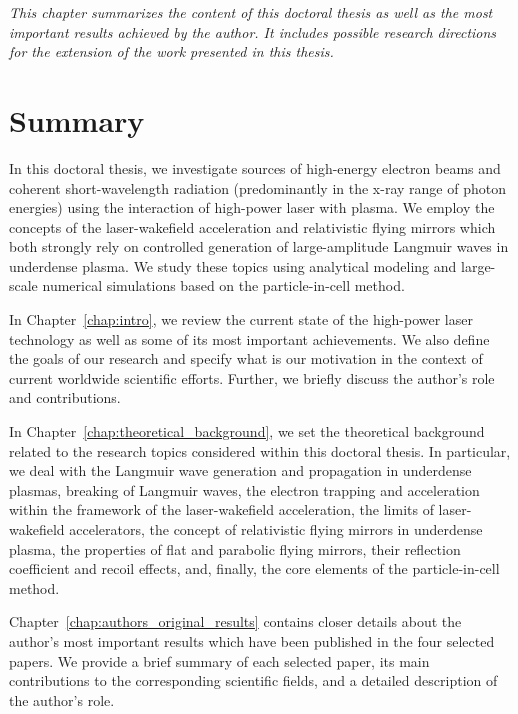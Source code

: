 \documentclass[10pt, a4paper, twoside, openright]{report}
\begin{document}
\noindent \textsl{This chapter summarizes the content of this doctoral thesis as well as the most important results achieved by the author. It includes possible research directions for the extension of the work presented in this thesis.}

\section{Summary}

In this doctoral thesis, we investigate sources of high-energy electron beams and coherent short-wavelength radiation (predominantly in the x-ray range of photon energies) using the interaction of high-power laser with plasma. We employ the concepts of the laser-wakefield acceleration and relativistic flying mirrors which both strongly rely on controlled generation of large-amplitude Langmuir waves in underdense plasma. We study these topics using analytical modeling and large-scale numerical simulations based on the particle-in-cell method.

In Chapter~\ref{chap:intro}, we review the current state of the high-power laser technology as well as some of its most important achievements. We also define the goals of our research and specify what is our motivation in the context of current worldwide scientific efforts. Further, we briefly discuss the author's role and contributions. 

In Chapter~\ref{chap:theoretical_background}, we set the theoretical background related to the research topics considered within this doctoral thesis. In particular, we deal with the Langmuir wave generation and propagation in underdense plasmas, breaking of Langmuir waves, the electron trapping and acceleration within the framework of the laser-wakefield acceleration, the limits of laser-wakefield accelerators, the concept of relativistic flying mirrors in underdense plasma, the properties of flat and parabolic flying mirrors, their reflection coefficient and recoil effects, and, finally, the core elements of the particle-in-cell method.

Chapter~\ref{chap:authors_original_results} contains closer details about the author's most important results which have been published in the four selected papers. We provide a brief summary of each selected paper, its main contributions to the corresponding scientific fields, and a detailed description of the author's role.
\end{document}
